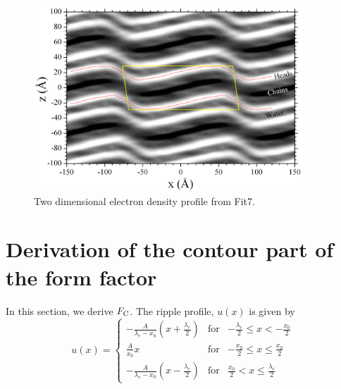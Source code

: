 \begin{figure}
  \centering
  \includegraphics[width=0.9\textwidth]{figures/ripple/LAXS/Fit7_2D_edp}
  \caption[]{Two dimensional electron density profile from Fit7.}
  \label{fig:Fit7_2D_edp}
\end{figure}

\newpage
\section{Derivation of the contour part of the form factor}\label{app:FC}
In this section, we derive $F_\mathrm{C}$. The ripple profile, $u(x)$ is given by
\begin{equation}
  u(x) = \left\{
    \begin{array}{ccc}
    -\frac{A}{\lambda_r-x_0}\left(x+\frac{\lambda_r}{2}\right) 
      & \text{for} 
      & -\frac{\lambda_r}{2} \leq x < -\frac{x_0}{2} \\
    \frac{A}{x_0}x 
      & \text{for} 
      & -\frac{x_0}{2} \leq x \leq \frac{x_0}{2} \\
    -\frac{A}{\lambda_r-x_0} \left(x-\frac{\lambda_r}{2}\right)
      & \text{for} 
      & \frac{x_0}{2} < x \leq \frac{\lambda_r}{2}
    \end{array} \right.
\end{equation}

